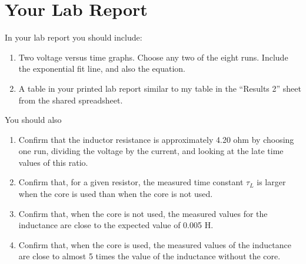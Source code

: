 \section{Your Lab Report}
In your lab report you should include:
\begin{enumerate}
	\item Two voltage versus time graphs. Choose any two of the eight runs. Include the exponential fit line, and also the equation.
	\item A table in your printed lab report similar to my table in the ``Results 2'' sheet from the shared spreadsheet.
\end{enumerate}
You should also
\begin{enumerate}
	\item Confirm that the inductor resistance is approximately 4.20 ohm by choosing one run, dividing the voltage by the current, and looking at the late time values of this ratio.
	\item Confirm that, for a given resistor, the measured time constant $\tau_{L}$ is larger when the core is used than when the core is not used.
	\item Confirm that, when the core is not used, the measured values for the inductance are close to the expected value of 0.005 H.
	\item Confirm that, when the core is used, the measured values of the inductance are close to almost 5 times the value of the inductance without the core.
\end{enumerate}
